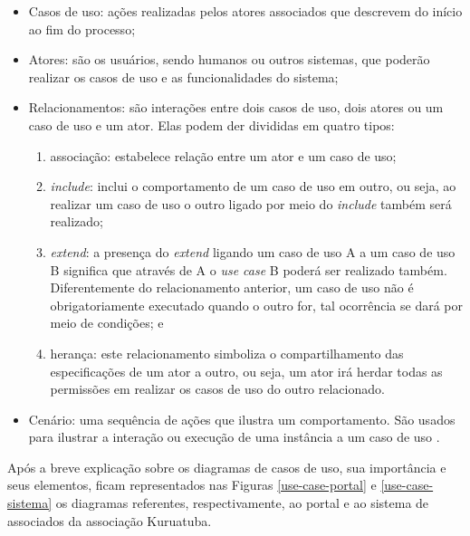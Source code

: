 \begin{itemize}
 \item Casos de uso: ações realizadas pelos atores associados que descrevem do início ao fim do processo;
 \item Atores: são os usuários, sendo humanos ou outros sistemas, que poderão realizar os casos de uso e as funcionalidades do sistema;
 \item Relacionamentos: são interações entre dois casos de uso, dois atores ou um caso de uso e um ator. Elas podem der divididas em quatro tipos:
 
 \begin{enumerate}
  \item associação: estabelece relação entre um ator e um caso de uso;
  \item \textit{include}: inclui o comportamento de um caso de uso em outro, ou seja, ao realizar um caso de uso o outro ligado por meio do \textit{include} também será realizado;
  \item \textit{extend}: a presença do \textit{extend} ligando um caso de uso A a um caso de uso B significa que através de A o \textit{use case} B poderá ser realizado também. Diferentemente do relacionamento anterior, um caso de uso não é obrigatoriamente executado quando o outro for, tal ocorrência se dará por meio de condições; e
  \item herança: este relacionamento simboliza o compartilhamento das especificações de um ator a outro, ou seja, um ator irá herdar todas as permissões em realizar os casos de uso do outro relacionado.
 \end{enumerate}
 
\item Cenário: uma sequência de ações que ilustra um comportamento. São usados para ilustrar a interação ou execução de uma instância a um caso de uso \cite[~p. 239, tradução nossa]{zapata2007conversion}. 

\end{itemize}

Após a breve explicação sobre os diagramas de casos de uso, sua importância e seus elementos, ficam representados nas Figuras \ref{use-case-portal} e \ref{use-case-sistema} os diagramas referentes, respectivamente, ao portal e ao sistema de associados da associação Kuruatuba.


